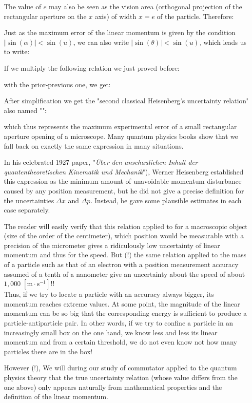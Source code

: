 	The value of $e$ may also be seen as the vision area (orthogonal projection of the rectangular aperture on the $x$ axis) of width $x=e$ of the particle. Therefore:
	
	Just as the maximum error of the linear momentum is given by the condition $|\sin(\alpha)|<\sin(u)$, we can also write  $|\sin(\theta)|<\sin(u)$, which leads us to write:
	
	If we multiply the following relation we just proved before:
	
	with the prior-previous one, we get:
	
	After simplification we get the "second classical Heisenberg's uncertainty relation" also named "":
	
	which thus represents the maximum experimental error of a small rectangular aperture opening of a microscope. Many quantum physics books show that we fall back on exactly the same expression in many situations.
	
	In his celebrated 1927 paper, "\textit{Über den anschaulichen Inhalt der quantentheoretischen Kinematik und Mechanik}"), Werner Heisenberg established this expression as the minimum amount of unavoidable momentum disturbance caused by any position measurement, but he did not give a precise definition for the uncertainties $\Delta x$ and $\Delta p$. Instead, he gave some plausible estimates in each case separately.
	\begin{tcolorbox}[title=Remark,colframe=black,arc=10pt]
	The reader will easily verify that this relation applied to for a macroscopic object (size of the order of the centimeter), which position would be measurable with a precision of the micrometer gives a ridiculously low uncertainty of linear momentum and thus for the speed. But (!) the same relation applied to the mass of a particle such as that of an electron with a position measurement accuracy assumed of a tenth of a nanometer give an uncertainty about the speed of about $1,000\;[\text{m}\cdot\text{s}^{-1}]$!!\\

	Thus, if we try to locate a particle with an accuracy always bigger, its momentum reaches extreme values. At some point, the magnitude of the linear momentum can be so big that the corresponding energy is sufficient to produce a particle-antiparticle pair. In other words, if we try to confine a particle in an increasingly small box on the one hand, we know less and less its linear momentum and from a certain threshold, we do not even know not how many particles there are in the box!
	\end{tcolorbox}
	However (!), We will during our study of commutator applied to the quantum physics theory that the true uncertainty relation (whose value differs from the one above) only appears naturally from mathematical properties and the definition of the linear momentum.

